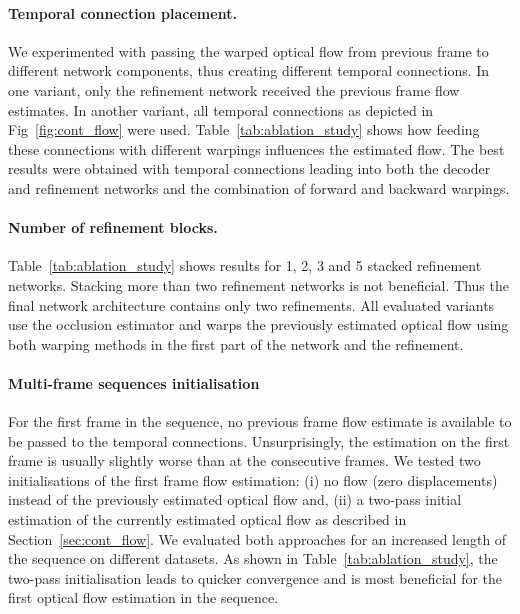 \documentclass[runningheads]{llncs}
\begin{document}
\paragraph{\bf\textbf{Temporal connection placement.}}
We experimented with passing the warped optical flow from previous frame to different network components, thus creating different temporal connections.
In one variant, only the refinement network received the previous frame flow estimates. In another variant, all temporal connections as depicted in Fig~\ref{fig:cont_flow} were used.
Table~\ref{tab:ablation_study} shows how feeding these connections with different warpings influences the estimated flow.
The best results were obtained with temporal connections leading into both the decoder and refinement networks and the combination of forward and backward warpings.

\paragraph{\bf\textbf{Number of refinement blocks.}}
Table~\ref{tab:ablation_study} shows results for 1, 2, 3 and 5 stacked refinement networks.
Stacking more than two refinement networks is not beneficial.
Thus the final network architecture contains only two refinements.
All evaluated variants use the occlusion estimator and warps the previously estimated optical flow using both warping methods in the first part of the network and the refinement.


\paragraph{\bf\textbf{Multi-frame sequences initialisation}}
For the first frame in the sequence, no previous frame flow estimate is available to be passed to the temporal connections.
Unsurprisingly, the estimation on the first frame is usually slightly worse than at the consecutive frames.
We tested two initialisations of the first frame flow estimation: (i) no flow (zero displacements) instead of the previously estimated optical flow and, (ii) a two-pass initial estimation of the currently estimated optical flow as described in Section~\ref{sec:cont_flow}.
We evaluated both approaches for an increased length of the sequence on different datasets.
As shown in Table~\ref{tab:ablation_study}, the two-pass initialisation leads to quicker convergence and is most beneficial for the first optical flow estimation in the sequence.
\end{document}
